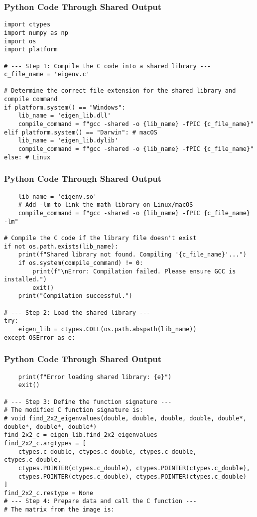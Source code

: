 \documentclass{beamer}
\begin{document}
\begin{frame}[fragile]
\frametitle{Python Code Through Shared Output}
\begin{lstlisting}
import ctypes
import numpy as np
import os
import platform

# --- Step 1: Compile the C code into a shared library ---
c_file_name = 'eigenv.c'

# Determine the correct file extension for the shared library and compile command
if platform.system() == "Windows":
    lib_name = 'eigen_lib.dll'
    compile_command = f"gcc -shared -o {lib_name} -fPIC {c_file_name}"
elif platform.system() == "Darwin": # macOS
    lib_name = 'eigen_lib.dylib'
    compile_command = f"gcc -shared -o {lib_name} -fPIC {c_file_name}"
else: # Linux
\end{lstlisting}
\end{frame}
\begin{frame}[fragile]
\frametitle{Python Code Through Shared Output}
\begin{lstlisting}
    lib_name = 'eigenv.so'
    # Add -lm to link the math library on Linux/macOS
    compile_command = f"gcc -shared -o {lib_name} -fPIC {c_file_name} -lm"

# Compile the C code if the library file doesn't exist
if not os.path.exists(lib_name):
    print(f"Shared library not found. Compiling '{c_file_name}'...")
    if os.system(compile_command) != 0:
        print(f"\nError: Compilation failed. Please ensure GCC is installed.")
        exit()
    print("Compilation successful.")

# --- Step 2: Load the shared library ---
try:
    eigen_lib = ctypes.CDLL(os.path.abspath(lib_name))
except OSError as e:
\end{lstlisting}
\end{frame}
\begin{frame}[fragile]
\frametitle{Python Code Through Shared Output}
\begin{lstlisting}
    print(f"Error loading shared library: {e}")
    exit()

# --- Step 3: Define the function signature ---
# The modified C function signature is:
# void find_2x2_eigenvalues(double, double, double, double, double*, double*, double*, double*)
find_2x2_c = eigen_lib.find_2x2_eigenvalues
find_2x2_c.argtypes = [
    ctypes.c_double, ctypes.c_double, ctypes.c_double, ctypes.c_double,
    ctypes.POINTER(ctypes.c_double), ctypes.POINTER(ctypes.c_double),
    ctypes.POINTER(ctypes.c_double), ctypes.POINTER(ctypes.c_double)
]
find_2x2_c.restype = None
# --- Step 4: Prepare data and call the C function ---
# The matrix from the image is:
\end{lstlisting}
\end{frame}
\end{document}
